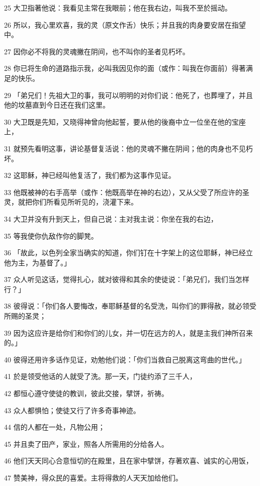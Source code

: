 \par 25 大卫指著他说：我看见主常在我眼前；他在我右边，叫我不至於摇动。
\par 26 所以，我心里欢喜，我的灵（原文作舌）快乐；并且我的肉身要安居在指望中。
\par 27 因你必不将我的灵魂撇在阴间，也不叫你的圣者见朽坏。
\par 28 你已将生命的道路指示我，必叫我因见你的面（或作：叫我在你面前）得著满足的快乐。
\par 29 「弟兄们！先祖大卫的事，我可以明明的对你们说：他死了，也葬埋了，并且他的坟墓直到今日还在我们这里。
\par 30 大卫既是先知，又晓得神曾向他起誓，要从他的後裔中立一位坐在他的宝座上，
\par 31 就预先看明这事，讲论基督复活说：他的灵魂不撇在阴间；他的肉身也不见朽坏。
\par 32 这耶稣，神已经叫他复活了，我们都为这事作见证。
\par 33 他既被神的右手高举（或作：他既高举在神的右边），又从父受了所应许的圣灵，就把你们所看见所听见的，浇灌下来。
\par 34 大卫并没有升到天上，但自己说：主对我主说：你坐在我的右边，
\par 35 等我使你仇敌作你的脚凳。
\par 36 「故此，以色列全家当确实的知道，你们钉在十字架上的这位耶稣，神已经立他为主，为基督了。」
\par 37 众人听见这话，觉得扎心，就对彼得和其余的使徒说：「弟兄们，我们当怎样行？」
\par 38 彼得说：「你们各人要悔改，奉耶稣基督的名受洗，叫你们的罪得赦，就必领受所赐的圣灵；
\par 39 因为这应许是给你们和你们的儿女，并一切在远方的人，就是主我们神所召来的。」
\par 40 彼得还用许多话作见证，劝勉他们说：「你们当救自己脱离这弯曲的世代。」
\par 41 於是领受他话的人就受了洗。那一天，门徒约添了三千人，
\par 42 都恒心遵守使徒的教训，彼此交接，擘饼，祈祷。
\par 43 众人都惧怕；使徒又行了许多奇事神迹。
\par 44 信的人都在一处，凡物公用；
\par 45 并且卖了田产，家业，照各人所需用的分给各人。
\par 46 他们天天同心合意恒切的在殿里，且在家中擘饼，存著欢喜、诚实的心用饭，
\par 47 赞美神，得众民的喜爱。主将得救的人天天加给他们。

